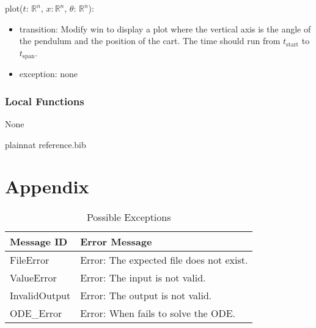 \documentclass[12pt, titlepage]{article}
\begin{document}
\noindent  plot($t$: $\mathbb{R}^{n}$, $x$$: \mathbb{R}^{n}$, $\theta$: $\mathbb{R}^{n}$):
\begin{itemize}
\item transition: Modify win to display a plot where the vertical axis
  is the angle of the pendulum and the position of the cart.  The time should run from $t_\text{start}$ to $t_\text{span}$.
\item exception: none
\end{itemize}


\subsubsection{Local Functions}
None
\newpage



 {plainnat}
 {reference.bib}

\newpage

\section{Appendix} \label{Appendix}
\begin{longtable}{l p{9cm}}
\caption{Possible Exceptions} \\
\toprule
\textbf{Message ID} & \textbf{Error Message} \\
\midrule
FileError & Error: The expected file does not exist. \\

ValueError & Error: The input is not valid. \\

InvalidOutput& Error: The output is not valid.\\
ODE\_Error&Error: When fails to solve the ODE.\\
\bottomrule
\end{longtable}
\end{document}
